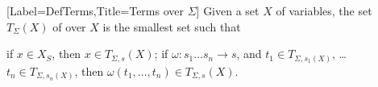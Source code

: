 [Label=DefTerms,Title=Terms over $\Sigma$]
Given a set $X$ of variables, the set $T_\Sigma(X)$ of
 over $X$ is the smallest set such that 
\begin{List}[Label=TermFormationRules,ListType=itemize]
  \ListItem
  if $x\in X_S$, then $x\in T_{\Sigma, s}(X)$;
  \ListItem
  if $\omega:s_1\ldots s_n\rightarrow s$, and
  $t_1\in T_{\Sigma,{s_1}(X)}$, \ldots
  $t_n\in T_{\Sigma,{s_n}(X)}$, then 
  $\omega(t_1,\ldots, t_n)\in T_{\Sigma,s}(X)$.
\end{List}
